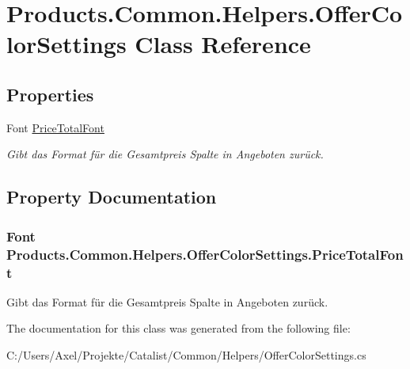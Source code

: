 \hypertarget{class_products_1_1_common_1_1_helpers_1_1_offer_color_settings}{}\section{Products.\+Common.\+Helpers.\+Offer\+Color\+Settings Class Reference}
\label{class_products_1_1_common_1_1_helpers_1_1_offer_color_settings}
\subsection*{Properties}
\begin{DoxyCompactItemize}
\item 
Font \hyperlink{class_products_1_1_common_1_1_helpers_1_1_offer_color_settings_a1c570d3730c52b7d9b931cf91ea66048}{Price\+Total\+Font}
\begin{DoxyCompactList}\small\item\em Gibt das Format für die Gesamtpreis Spalte in Angeboten zurück. \end{DoxyCompactList}\end{DoxyCompactItemize}


\subsection{Property Documentation}
\subsubsection[{\texorpdfstring{Price\+Total\+Font}{PriceTotalFont}}]{\setlength{\rightskip}{0pt plus 5cm}Font Products.\+Common.\+Helpers.\+Offer\+Color\+Settings.\+Price\+Total\+Font\hspace{0.3cm}{\ttfamily [get]}}\hypertarget{class_products_1_1_common_1_1_helpers_1_1_offer_color_settings_a1c570d3730c52b7d9b931cf91ea66048}{}\label{class_products_1_1_common_1_1_helpers_1_1_offer_color_settings_a1c570d3730c52b7d9b931cf91ea66048}


Gibt das Format für die Gesamtpreis Spalte in Angeboten zurück. 



The documentation for this class was generated from the following file\+:\begin{DoxyCompactItemize}
\item 
C\+:/\+Users/\+Axel/\+Projekte/\+Catalist/\+Common/\+Helpers/Offer\+Color\+Settings.\+cs\end{DoxyCompactItemize}
